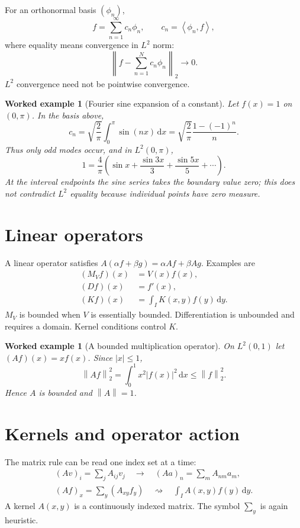 \documentclass[11pt,a5paper,oneside,openany]{scrreprt}
\theoremstyle{notes}
\theoremstyle{definitions}
\newtheorem{example}[theorem]{Worked example}
\newcommand{\ip}[2]{\left\langle #1,#2\right\rangle}
\newcommand{\norm}[1]{\left\lVert #1\right\rVert}
\newcommand{\dd}{\,\mathrm{d}}
\begin{document}
For an orthonormal basis $(\phi_n)$,
\[
  \boxed{f=\sum_{n=1}^{\infty}c_n\phi_n,
  \qquad c_n=\ip{\phi_n}{f}},
\]
where equality means convergence in $L^2$ norm:
\[
 \norm{f-\sum_{n=1}^{N}c_n\phi_n}_2\longrightarrow0.
\]
$L^2$ convergence need not be pointwise convergence.

\begin{example}[Fourier sine expansion of a constant]
Let $f(x)=1$ on $(0,\pi)$.  In the basis above,
\[
 c_n=\sqrt{\frac2\pi}\int_0^\pi\sin(nx)\dd x
 =\sqrt{\frac2\pi}\frac{1-(-1)^n}{n}.
\]
Thus only odd modes occur, and in $L^2(0,\pi)$,
\[
 1=\frac4\pi\left(\sin x+\frac{\sin3x}{3}
 +\frac{\sin5x}{5}+\cdots\right).
\]
At the interval endpoints the sine series takes the boundary value zero; this
does not contradict $L^2$ equality because individual points have zero measure.
\end{example}

\section{Linear operators}

A linear operator satisfies $A(\alpha f+\beta g)=\alpha Af+\beta Ag$.
Examples are
\[
\begin{aligned}
 (M_Vf)(x)&=V(x)f(x),\\
 (Df)(x)&=f'(x),\\
 (Kf)(x)&=\int_IK(x,y)f(y)\dd y.
\end{aligned}
\]
$M_V$ is bounded when $V$ is essentially bounded.  Differentiation is
unbounded and requires a domain.  Kernel conditions control $K$.

\begin{example}[A bounded multiplication operator]
On $L^2(0,1)$ let $(Af)(x)=x f(x)$.  Since $|x|\le1$,
\[
 \norm{Af}_2^2=\int_0^1x^2|f(x)|^2\dd x\le\norm{f}_2^2.
\]
Hence $A$ is bounded and $\norm{A}=1$.
\end{example}

\section{Kernels and operator action}

The matrix rule can be read one index set at a time:
\[
 \boxed{\begin{gathered}
 (Av)_i=\sum_jA_{ij}v_j
 \quad\longrightarrow\quad
 (Aa)_n=\sum_mA_{nm}a_m,\\[2mm]
 (Af)_x=\sum_y(A_{xy}f_y)
 \quad\rightsquigarrow\quad
 \int_I A(x,y)f(y)\dd y.
 \end{gathered}}
\]
A kernel $A(x,y)$ is a continuously indexed matrix.  The symbol $\sum_y$ is
again heuristic.
\end{document}
